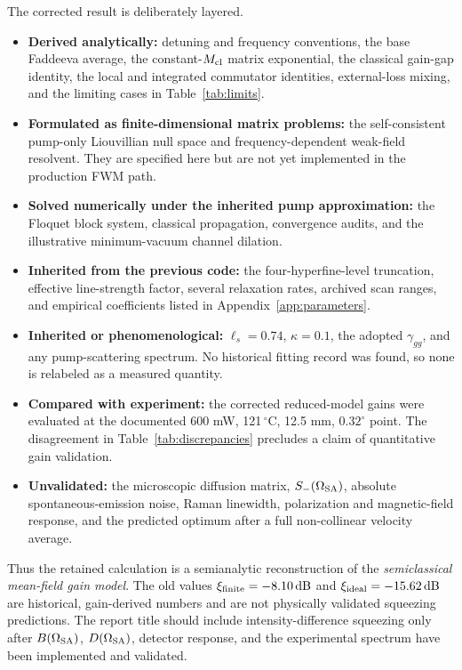 \documentclass[11pt,a4paper]{article}
\newcommand{\dB}{\,\mathrm{dB}}
\begin{document}
The corrected result is deliberately layered.
\begin{itemize}
\item \textbf{Derived analytically:} detuning and frequency conventions,
the base Faddeeva average, the constant-$M_{\rm cl}$ matrix exponential,
the classical gain-gap identity, the local and integrated commutator
identities, external-loss mixing, and the limiting cases in
Table~\ref{tab:limits}.
\item \textbf{Formulated as finite-dimensional matrix problems:} the
self-consistent pump-only Liouvillian null space and frequency-dependent
weak-field resolvent. They are specified here but are not yet implemented in
the production FWM path.
\item \textbf{Solved numerically under the inherited pump approximation:}
the Floquet block system, classical propagation, convergence audits, and the
illustrative minimum-vacuum channel dilation.
\item \textbf{Inherited from the previous code:} the four-hyperfine-level
truncation, effective line-strength factor, several relaxation rates,
archived scan ranges, and empirical coefficients listed in
Appendix~\ref{app:parameters}.
\item \textbf{Inherited or phenomenological:} $\ell_s=0.74$,
$\kappa=0.1$, the adopted $\gamma_{gg}$, and any pump-scattering spectrum.
No historical fitting record was found, so none is relabeled as a measured
quantity.
\item \textbf{Compared with experiment:} the corrected reduced-model gains
were evaluated at the documented 600 mW, 121\,$^\circ$C, 12.5 mm,
$0.32^\circ$ point. The disagreement in Table~\ref{tab:discrepancies}
precludes a claim of quantitative gain validation.
\item \textbf{Unvalidated:} the microscopic diffusion matrix,
$S_-(\Omega_{\rm SA})$, absolute spontaneous-emission noise, Raman
linewidth, polarization and magnetic-field response, and the predicted
optimum after a full non-collinear velocity average.
\end{itemize}

Thus the retained calculation is a semianalytic reconstruction of the
\emph{semiclassical mean-field gain model}. The old values
$\xi_{\rm finite}=-8.10\dB$ and $\xi_{\rm ideal}=-15.62\dB$ are historical,
gain-derived numbers and are not physically validated squeezing predictions.
The report title should include intensity-difference squeezing only after
$B(\Omega_{\rm SA})$, $D(\Omega_{\rm SA})$, detector response, and the
experimental spectrum have been implemented and validated.
\end{document}
